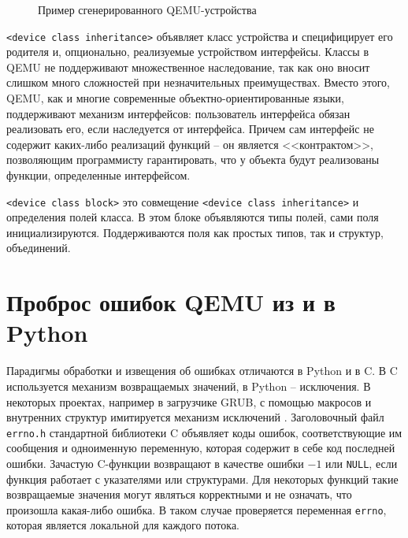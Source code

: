 \begin{figure}[!htbp]
    \centering
    \hspace*{-10cm}
    \begin{minipage}{10cm}
        
    \end{minipage}
    \caption{Пример сгенерированного QEMU-устройства}\label{fig:qemu-module-example}
\end{figure}

\texttt{<device class inheritance>} объявляет класс устройства и специфицирует
его родителя и, опционально, реализуемые устройством интерфейсы.
Классы в QEMU не поддерживают множественное наследование, так как
оно вносит слишком много сложностей при незначительных преимуществах.
Вместо этого, QEMU, как и многие современные объектно-ориентированные языки,
поддерживают механизм интерфейсов: пользователь интерфейса обязан реализовать
его, если наследуется от интерфейса. Причем сам интерфейс не содержит каких-либо
реализаций функций -- он является <<контрактом>>, позволяющим программисту гарантировать,
что у объекта будут реализованы функции, определенные интерфейсом.

\texttt{<device class block>} это совмещение \texttt{<device class inheritance>} и определения полей класса. В этом блоке объявляются типы
полей, сами поля инициализируются. Поддерживаются поля как простых типов, так и структур, объединений.

\section{Проброс ошибок QEMU из и в Python}\label{sec:ch2/sec2/sub5}
Парадигмы обработки и извещения об ошибках отличаются в Python и в C.
В C используется механизм возвращаемых значений, в Python -- исключения.
В некоторых проектах, например в загрузчике GRUB, с помощью макросов и
внутренних структур имитируется механизм исключений \cite{grub-error-handling}.
Заголовочный файл \texttt{errno.h} стандартной библиотеки C объявляет
коды ошибок, соответствующие им сообщения и одноименную переменную,
которая содержит в себе код последней ошибки.
Зачастую C-функции возвращают в качестве ошибки $-1$ или \texttt{NULL},
если функция работает с указателями или структурами.
Для некоторых функций такие возвращаемые значения могут являться корректными
и не означать, что произошла какая-либо ошибка.
В таком случае проверяется переменная \texttt{errno}, которая
является локальной для каждого потока.

